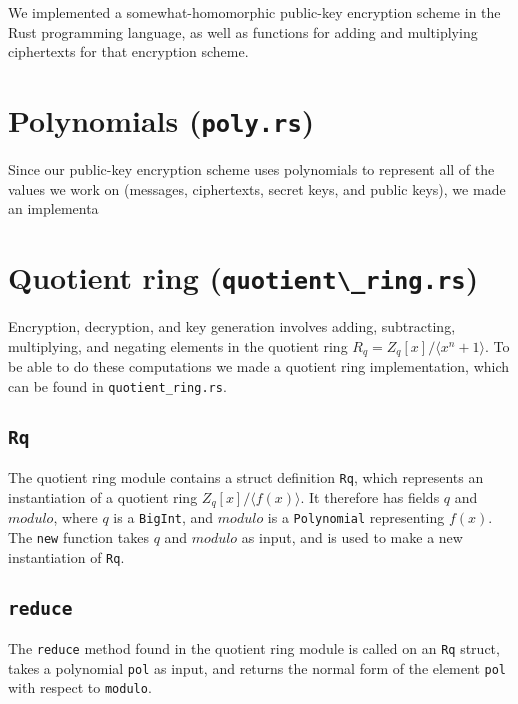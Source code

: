\documentclass[../main.tex]{subfiles}
\begin{document}
We implemented a somewhat-homomorphic public-key encryption scheme in the Rust programming language, as well as functions for adding and multiplying ciphertexts for that encryption scheme.

\section{Polynomials (\lstinline{poly.rs})}

Since our public-key encryption scheme uses polynomials to represent all of the values we work on (messages, ciphertexts, secret keys, and public keys), we made an implementa

\section{Quotient ring (\lstinline{quotient\_ring.rs})}
Encryption, decryption, and key generation involves adding, subtracting, multiplying, and negating elements in the quotient ring $R_q = Z_q[x]/\langle x^n + 1 \rangle$. To be able to do these computations we made a quotient ring implementation, which can be found in \lstinline{quotient_ring.rs}.

\subsection{\lstinline{Rq}}
The quotient ring module contains a struct definition \lstinline{Rq}, which represents an instantiation of a quotient ring $Z_q[x]/\langle f(x) \rangle$. It therefore has fields $q$ and $modulo$, where $q$ is a \lstinline{BigInt}, and $modulo$ is a \lstinline{Polynomial} representing $f(x)$. The \lstinline{new} function takes $q$ and $modulo$ as input, and is used to make a new instantiation of \lstinline{Rq}.

\subsection{\lstinline{reduce}}
The \lstinline{reduce} method found in the quotient ring module is called on an \lstinline{Rq} struct, takes a polynomial \lstinline{pol} as input, and returns the normal form of the element \lstinline{pol} with respect to \lstinline{modulo}.
\end{document}
